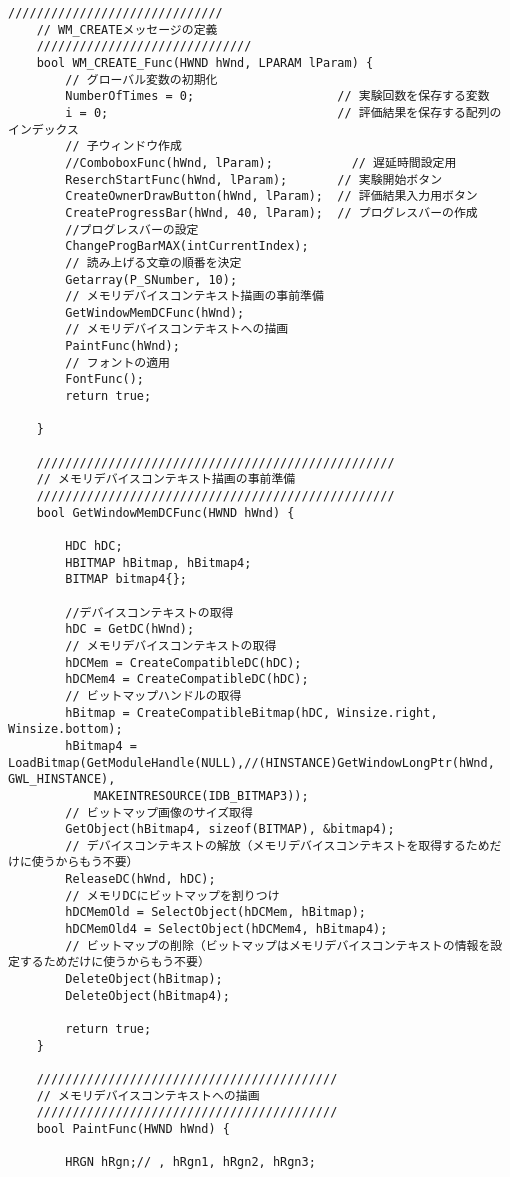 \begin{lstlisting}[caption=main.cpp]
	//////////////////////////////
	// WM_CREATEメッセージの定義
	//////////////////////////////
	bool WM_CREATE_Func(HWND hWnd, LPARAM lParam) {
		// グローバル変数の初期化
		NumberOfTimes = 0;                    // 実験回数を保存する変数
		i = 0;                                // 評価結果を保存する配列のインデックス
		// 子ウィンドウ作成
		//ComboboxFunc(hWnd, lParam);           // 遅延時間設定用
		ReserchStartFunc(hWnd, lParam);       // 実験開始ボタン
		CreateOwnerDrawButton(hWnd, lParam);  // 評価結果入力用ボタン
		CreateProgressBar(hWnd, 40, lParam);  // プログレスバーの作成
		//プログレスバーの設定
		ChangeProgBarMAX(intCurrentIndex);
		// 読み上げる文章の順番を決定									  
		Getarray(P_SNumber, 10);
		// メモリデバイスコンテキスト描画の事前準備
		GetWindowMemDCFunc(hWnd);
		// メモリデバイスコンテキストへの描画
		PaintFunc(hWnd);
		// フォントの適用
		FontFunc();                        
		return true;
	
	}
	
	//////////////////////////////////////////////////
	// メモリデバイスコンテキスト描画の事前準備
	//////////////////////////////////////////////////
	bool GetWindowMemDCFunc(HWND hWnd) {
	
		HDC hDC;
		HBITMAP hBitmap, hBitmap4;
		BITMAP bitmap4{};
		
		//デバイスコンテキストの取得
		hDC = GetDC(hWnd);
		// メモリデバイスコンテキストの取得
		hDCMem = CreateCompatibleDC(hDC);
		hDCMem4 = CreateCompatibleDC(hDC);
		// ビットマップハンドルの取得
		hBitmap = CreateCompatibleBitmap(hDC, Winsize.right, Winsize.bottom);
		hBitmap4 = LoadBitmap(GetModuleHandle(NULL),//(HINSTANCE)GetWindowLongPtr(hWnd, GWL_HINSTANCE),
			MAKEINTRESOURCE(IDB_BITMAP3));
		// ビットマップ画像のサイズ取得
		GetObject(hBitmap4, sizeof(BITMAP), &bitmap4);
		// デバイスコンテキストの解放（メモリデバイスコンテキストを取得するためだけに使うからもう不要）
		ReleaseDC(hWnd, hDC);
		// メモリDCにビットマップを割りつけ
		hDCMemOld = SelectObject(hDCMem, hBitmap);
		hDCMemOld4 = SelectObject(hDCMem4, hBitmap4);
		// ビットマップの削除（ビットマップはメモリデバイスコンテキストの情報を設定するためだけに使うからもう不要）
		DeleteObject(hBitmap);
		DeleteObject(hBitmap4);
	
		return true;
	}
	
	//////////////////////////////////////////
	// メモリデバイスコンテキストへの描画
	//////////////////////////////////////////
	bool PaintFunc(HWND hWnd) {
	
		HRGN hRgn;// , hRgn1, hRgn2, hRgn3;
	

\end{lstlisting}
